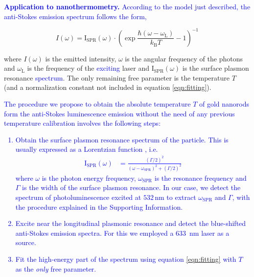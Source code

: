 \documentclass[journal=nalefd,manuscript=letter]{achemso}
\newcommand{\HI}[1]{\textcolor{blue}{#1}} %
\newcommand{\nm}{\ensuremath{\,\textrm{nm}}}
\begin{document}
\HI{\textbf{Application to nanothermometry.} According to the model just
described, the anti-Stokes emission spectrum follows the form,}

\begin{equation}\label{eqn:fitting}
	I(\omega) =
	\textrm{I}_{\textrm{SPR}}(\omega)\cdot\left(\exp\frac{\hbar(\omega-\omega_\textrm{L})}{k_\textrm{B}T}-1\right)^{-1}
\end{equation}

\noindent where $I(\omega) $ is the emitted intensity, $\omega$ is the angular frequency
of the photons and $\omega_\textrm{L}$ is the frequency of the \HI{exciting} laser and
$\textrm{I}_{\textrm{SPR}}(\omega) $ is the surface plasmon resonance \HI{spectrum}.
The only remaining free parameter is the temperature $T$ (and a normalization
constant not included in equation \ref{eqn:fitting}). 

\HI{The procedure we propose to obtain the absolute temperature $T$ of gold nanorods 
form the anti-Stokes luminescence emission without 
the need of any previous temperature calibration involves the following steps:}
\HI{\begin{enumerate}
	\item Obtain the surface plasmon resonance spectrum of the particle. This is usually expressed as a 
	Lorentzian function \cite{Zijlstra2011}, i.e.
	\begin{align*}
	\textrm{I}_{\textrm{SPR}}(\omega) &= \frac{\left( \Gamma/2 \right)^2}{\left( \omega-\omega_\textrm{SPR}\right)^2 +
	\left( \Gamma/2 \right)^2} 
	\end{align*}
	where $\omega$ is the photon energy frequency, $\omega_\textrm{SPR}$ is the resonance frequency 
	and $\Gamma$ is the width of the surface plasmon resonance.
	In our case, we detect the spectrum of photoluminescence	excited at $532\nm$ to extract 
	$\omega_\textrm{SPR}$ and $\Gamma$, with the procedure explained in the Supporting Information. 
	\item Excite near the longitudinal plasmonic resonance and detect the blue-shifted anti-Stokes emission spectra. For this we employed a $633\,$ nm  laser as a source. 
	\item Fit the high-energy part of the spectrum using equation \ref{eqn:fitting} with $T$ as the \textit{only} free parameter.
\end{enumerate}
}
\end{document}
